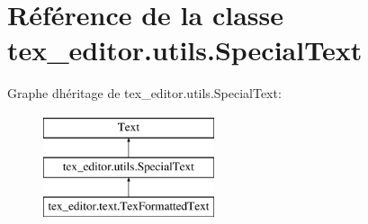 \hypertarget{classtex__editor_1_1utils_1_1_special_text}{}\section{Référence de la classe tex\+\_\+editor.\+utils.\+Special\+Text}
\label{classtex__editor_1_1utils_1_1_special_text}
Graphe d\textquotesingle{}héritage de tex\+\_\+editor.\+utils.\+Special\+Text\+:\begin{figure}[H]
\begin{center}
\leavevmode
\includegraphics[height=3.000000cm]{classtex__editor_1_1utils_1_1_special_text}
\end{center}
\end{figure}
